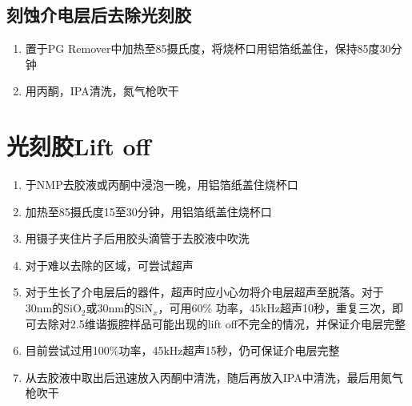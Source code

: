     \subsection{刻蚀介电层后去除光刻胶} %
    \label{sub:刻蚀介电层后去除光刻胶}
        \begin{enumerate}
            \item 置于PG Remover中加热至85摄氏度，将烧杯口用铝箔纸盖住，保持85度30分钟
            \item 用丙酮，IPA清洗，氮气枪吹干
        \end{enumerate}

\section{光刻胶Lift off} %
\label{sec:光刻胶lift_off}
        \begin{enumerate}
            \item 于NMP去胶液或丙酮中浸泡一晚，用铝箔纸盖住烧杯口
            \item 加热至85摄氏度15至30分钟，用铝箔纸盖住烧杯口
            \item 用镊子夹住片子后用胶头滴管于去胶液中吹洗
            \item 对于难以去除的区域，可尝试超声
            \item 对于生长了介电层后的器件，超声时应小心勿将介电层超声至脱落。对于30nm的SiO$_2$或30nm的SiN$_x$，可用60\% 功率，45kHz超声10秒，重复三次，即可去除对2.5维谐振腔样品可能出现的lift off不完全的情况，并保证介电层完整
            \item 目前尝试过用100\%功率，45kHz超声15秒，仍可保证介电层完整
            \item 从去胶液中取出后迅速放入丙酮中清洗，随后再放入IPA中清洗，最后用氮气枪吹干
        \end{enumerate}


